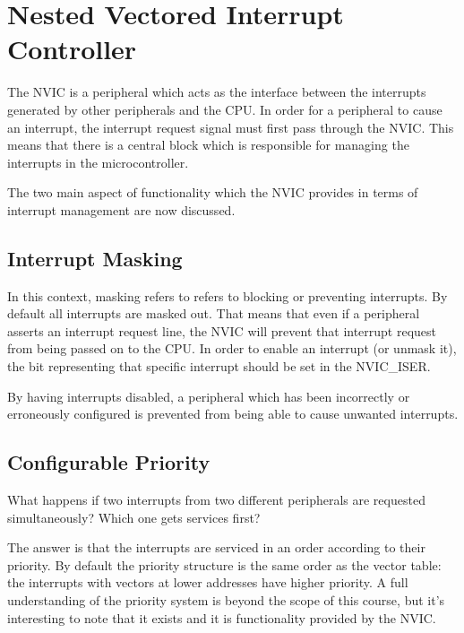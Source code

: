 \chapter{Nested Vectored Interrupt Controller}
The NVIC is a peripheral which acts as the interface between the interrupts generated by other peripherals and the CPU.
In order for a peripheral to cause an interrupt, the interrupt request signal must first pass through the NVIC.
This means that there is a central block which is responsible for managing the interrupts in the microcontroller.

The two main aspect of functionality which the NVIC provides in terms of interrupt management are now discussed.

\section{Interrupt Masking}
In this context, masking refers to refers to blocking or preventing interrupts.
By default all interrupts are masked out.
That means that even if a peripheral asserts an interrupt request line, the NVIC will prevent that interrupt request from being passed on to the CPU.
In order to enable an interrupt (or unmask it), the bit representing that specific interrupt should be set in the NVIC\_ISER.

By having interrupts disabled, a peripheral which has been incorrectly or erroneously configured is prevented from being able to cause unwanted interrupts. 

\section{Configurable Priority}
What happens if two interrupts from two different peripherals are requested simultaneously? Which one gets services first?

The answer is that the interrupts are serviced in an order according to their priority. 
By default the priority structure is the same order as the vector table: the interrupts with vectors at lower addresses have higher priority. 
A full understanding of the priority system is beyond the scope of this course, but it's interesting to note that it exists and it is functionality provided by the NVIC.
